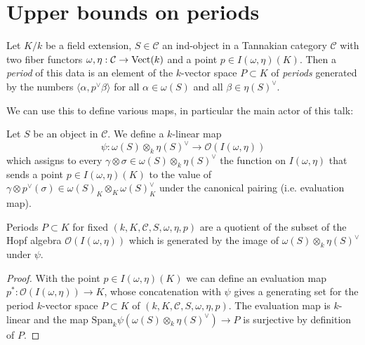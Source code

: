 

\section{Upper bounds on periods}

\begin{defn}
 Let $K/k$ be a field extension, $S \in \mathcal{C}$ an ind-object in a Tannakian category $\mathcal{C}$ with two fiber functors $\omega, \eta : \mathcal{C} \to \mathrm{Vect}(k)$ and a point $p \in I(\omega,\eta)(K)$. Then a \emph{period} of this data is an element of the $k$-vector space $P \subset K$ of \emph{periods} generated by the numbers $\langle \alpha,p^\vee \beta\rangle$ for all $\alpha \in \omega(S)$ and all $\beta \in \eta(S)^\vee$.
\end{defn}

We can use this to define various maps, in particular the main actor of this talk:
\begin{defn}
 Let $S$ be an object in $\mathcal{C}$.
 We define a $k$-linear map
\[\psi: \omega(S) \otimes_k \eta(S)^\vee \to \mathcal{O}(I(\omega,\eta))\]
which assigns to every $\gamma \otimes \sigma \in \omega(S) \otimes_k \eta(S)^\vee$ the function on $I(\omega,\eta)$ that sends a point $p \in I(\omega,\eta)(K)$ to the value of $\gamma \otimes p^\vee(\sigma) \in \omega(S)_K \otimes_K \omega(S)^\vee_K$ under the canonical pairing (i.e. evaluation map).
\end{defn}

\begin{prop}
 Periods $P \subset K$ for fixed $(k,K,\mathcal{C},S,\omega,\eta,p)$ are a quotient of the subset of the Hopf algebra $\mathcal{O}(I(\omega,\eta))$ which is generated by the image of $\omega(S) \otimes_k \eta(S)^\vee$ under $\psi$.
\end{prop}
\begin{proof}
 With the point $p \in I(\omega,\eta)(K)$ we can define an evaluation map $p^\ast : \mathcal{O}(I(\omega,\eta)) \to K$, whose concatenation with $\psi$ gives a generating set for the period $k$-vector space $P \subset K$ of $(k,K,\mathcal{C},S,\omega,\eta,p)$. The evaluation map is $k$-linear and the map $\mathrm{Span}_k\psi\left(\omega(S) \otimes_k \eta(S)^\vee\right) \to P$ is surjective by definition of $P$.
\end{proof}


